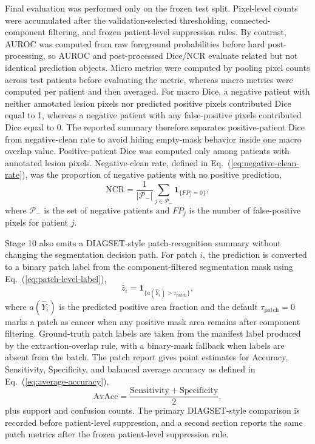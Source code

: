 \documentclass[a4paper,fleqn]{cas-dc}
\newcommand{\indicator}[1]{\mathbf{1}_{\{#1\}}}
\begin{document}
Final evaluation was performed only on the frozen test split. Pixel-level counts were accumulated after the validation-selected thresholding, connected-component filtering, and frozen patient-level suppression rules. By contrast, AUROC was computed from raw foreground probabilities before hard post-processing, so AUROC and post-processed Dice/NCR evaluate related but not identical prediction objects. Micro metrics were computed by pooling pixel counts across test patients before evaluating the metric, whereas macro metrics were computed per patient and then averaged. For macro Dice, a negative patient with neither annotated lesion pixels nor predicted positive pixels contributed Dice equal to 1, whereas a negative patient with any false-positive pixels contributed Dice equal to 0. The reported summary therefore separates positive-patient Dice from negative-clean rate to avoid hiding empty-mask behavior inside one macro overlap value. Positive-patient Dice was computed only among patients with annotated lesion pixels. Negative-clean rate, defined in Eq.~(\ref{eq:negative-clean-rate}), was the proportion of negative patients with no positive prediction,
\begin{equation}
\mathrm{NCR}=\frac{1}{|\mathcal{P}_-|}\sum_{j\in\mathcal{P}_-}\indicator{FP_j=0},
\label{eq:negative-clean-rate}
\end{equation}
where $\mathcal{P}_-$ is the set of negative patients and $FP_j$ is the number of false-positive pixels for patient $j$.

Stage 10 also emits a DIAGSET-style patch-recognition summary without changing the segmentation decision path. For patch $i$, the prediction is converted to a binary patch label from the component-filtered segmentation mask using Eq.~(\ref{eq:patch-level-label}),
\begin{equation}
\hat{z}_i=\indicator{a(\hat{Y}_i)>\tau_{\mathrm{patch}}},
\label{eq:patch-level-label}
\end{equation}
where $a(\hat{Y}_i)$ is the predicted positive area fraction and the default $\tau_{\mathrm{patch}}=0$ marks a patch as cancer when any positive mask area remains after component filtering. Ground-truth patch labels are taken from the manifest label produced by the extraction-overlap rule, with a binary-mask fallback when labels are absent from the batch. The patch report gives point estimates for Accuracy, Sensitivity, Specificity, and balanced average accuracy as defined in Eq.~(\ref{eq:average-accuracy}),
\begin{equation}
\mathrm{AvAcc}=\frac{\mathrm{Sensitivity}+\mathrm{Specificity}}{2},
\label{eq:average-accuracy}
\end{equation}
plus support and confusion counts. The primary DIAGSET-style comparison is recorded before patient-level suppression, and a second section reports the same patch metrics after the frozen patient-level suppression rule.
\end{document}
